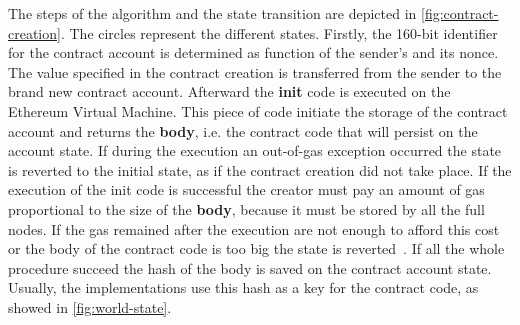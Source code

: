 The steps of the algorithm and the state transition are depicted in
\autoref{fig:contract-creation}. The circles represent the different states.
Firstly, the 160-bit identifier for the contract account is determined as
function of the sender's and its nonce. The value specified in the contract
creation is transferred from the sender to the brand new contract account.
Afterward the \textbf{init} code is executed on the Ethereum Virtual Machine.
This  piece of code initiate the storage of the contract account and returns the
\textbf{body}, i.e. the contract code that will persist on the account state.
If during the execution an out-of-gas exception occurred the state is reverted
to the initial state, as if the contract creation did not take place.
If the execution of the init code is successful the creator must pay an amount
of gas proportional to the size of the \textbf{body}, because it must be
stored by all the full nodes. If the gas remained after the execution are not
enough to afford this cost or the body of the contract code is too big the
state is reverted~\cite{wood2018ethereum}.
If all the whole procedure succeed the hash of the body is saved on the
contract account state. Usually, the implementations use this hash as a key for
the contract code, as showed in \autoref{fig:world-state}.
 
